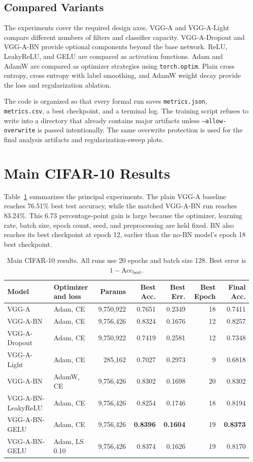 \documentclass[10pt,twocolumn]{article}
\newcommand{\acc}{\mathrm{Acc}}
\begin{document}
\subsection{Compared Variants}
The experiments cover the required design axes. VGG-A and VGG-A-Light compare different numbers of filters and classifier capacity. VGG-A-Dropout and VGG-A-BN provide optional components beyond the base network. ReLU, LeakyReLU, and GELU are compared as activation functions. Adam and AdamW are compared as optimizer strategies using \texttt{torch.optim}. Plain cross entropy, cross entropy with label smoothing, and AdamW weight decay provide the loss and regularization ablation.

The code is organized so that every formal run saves \texttt{metrics.json}, \texttt{metrics.csv}, a best checkpoint, and a terminal log. The training script refuses to write into a directory that already contains major artifacts unless \texttt{--allow-overwrite} is passed intentionally. The same overwrite protection is used for the final analysis artifacts and regularization-sweep plots.

\section{Main CIFAR-10 Results}
Table~\ref{tab:main} summarizes the principal experiments. The plain VGG-A baseline reaches 76.51\% best test accuracy, while the matched VGG-A-BN run reaches 83.24\%. This 6.73 percentage-point gain is large because the optimizer, learning rate, batch size, epoch count, seed, and preprocessing are held fixed. BN also reaches its best checkpoint at epoch 12, earlier than the no-BN model's epoch 18 best checkpoint.

\begin{table}[t]
\centering
\caption{Main CIFAR-10 results. All runs use 20 epochs and batch size 128. Best error is $1-\acc_{\mathrm{best}}$.}
\label{tab:main}
\small
\begin{tabular}{llrrrrr}
\toprule
Model & Optimizer and loss & Params & Best Acc. & Best Err. & Best Epoch & Final Acc.\\
\midrule
VGG-A & Adam, CE & 9,750,922 & 0.7651 & 0.2349 & 18 & 0.7411\\
VGG-A-BN & Adam, CE & 9,756,426 & 0.8324 & 0.1676 & 12 & 0.8257\\
VGG-A-Dropout & Adam, CE & 9,750,922 & 0.7419 & 0.2581 & 12 & 0.7348\\
VGG-A-Light & Adam, CE & 285,162 & 0.7027 & 0.2973 & 9 & 0.6818\\
VGG-A-BN & AdamW, CE & 9,756,426 & 0.8302 & 0.1698 & 20 & 0.8302\\
VGG-A-BN-LeakyReLU & Adam, CE & 9,756,426 & 0.8254 & 0.1746 & 18 & 0.8194\\
VGG-A-BN-GELU & Adam, CE & 9,756,426 & \textbf{0.8396} & \textbf{0.1604} & 19 & \textbf{0.8373}\\
VGG-A-BN-GELU & Adam, LS 0.10 & 9,756,426 & 0.8374 & 0.1626 & 19 & 0.8170\\
\bottomrule
\end{tabular}
\end{table}
\end{document}
